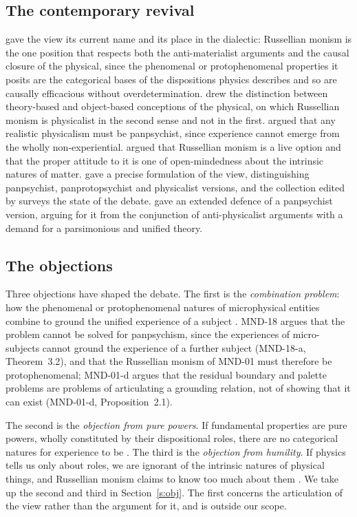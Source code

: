 \documentclass{situationist-preprint}
\begin{document}
\subsection{The contemporary revival}

\citet{Chalmers1996} gave the view its current name and its place in the dialectic: Russellian monism is the one position that respects both the anti-materialist arguments and the causal closure of the physical, since the phenomenal or protophenomenal properties it posits are the categorical bases of the dispositions physics describes and so are causally efficacious without overdetermination. \citet{Stoljar2001} drew the distinction between theory-based and object-based conceptions of the physical, on which Russellian monism is physicalist in the second sense and not in the first. \citet{Strawson2006} argued that any realistic physicalism must be panpsychist, since experience cannot emerge from the wholly non-experiential. \citet{Pereboom2011} argued that Russellian monism is a live option and that the proper attitude to it is one of open-mindedness about the intrinsic natures of matter. \citet{AlterNagasawa2012} gave a precise formulation of the view, distinguishing panpsychist, panprotopsychist and physicalist versions, and the collection edited by \citet{AlterNagasawa2015} surveys the state of the debate. \citet{Goff2017} gave an extended defence of a panpsychist version, arguing for it from the conjunction of anti-physicalist arguments with a demand for a parsimonious and unified theory.

\subsection{The objections}

Three objections have shaped the debate. The first is the \emph{combination problem}: how the phenomenal or protophenomenal natures of microphysical entities combine to ground the unified experience of a subject \citep{Coleman2014,Chalmers2017}. MND-18 argues that the problem cannot be solved for panpsychism, since the experiences of micro-subjects cannot ground the experience of a further subject (MND-18-a, Theorem~3.2), and that the Russellian monism of MND-01 must therefore be protophenomenal; MND-01-d argues that the residual boundary and palette problems are problems of articulating a grounding relation, not of showing that it can exist (MND-01-d, Proposition~2.1).

The second is the \emph{objection from pure powers}. If fundamental properties are pure powers, wholly constituted by their dispositional roles, there are no categorical natures for experience to be \citep{Bird2007}. The third is the \emph{objection from humility}. If physics tells us only about roles, we are ignorant of the intrinsic natures of physical things, and Russellian monism claims to know too much about them \citep{Langton1998,Lewis2009}. We take up the second and third in Section~\ref{s:obj}. The first concerns the articulation of the view rather than the argument for it, and is outside our scope.
\end{document}
